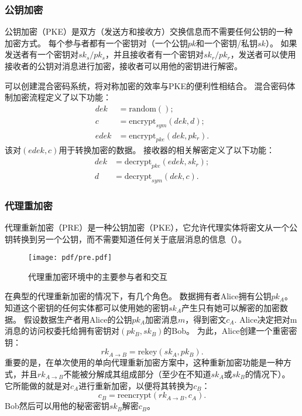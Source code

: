 \documentclass[longbibliography,nofootinbib]{revtex4-1}
\begin{document}
\begin{CJK*}{UTF8}{gbsn}
\subsubsection{公钥加密}

公钥加密（PKE）是双方（发送方和接收方）交换信息而不需要任何公钥的一种加密方式。
每个参与者都有一个密钥对（一个公钥$pk$和一个密钥/私钥$sk$）。
如果发送者有一个密钥对$sk_s/pk_s$，并且接收者有一个密钥对$sk_r/pk_r$，发送者可以使用接收者的公钥对消息进行加密，接收者可以用他的密钥进行解密。

可以创建混合密码系统，将对称加密的效率与PKE的便利性相结合。
混合密码体制加密流程定义了以下功能：
\begin{align}
    dek &= \text{random}();\\
    c &= \text{encrypt}_{sym}(dek, d);\\
    edek &= \text{encrypt}_{pke}(dek, pk_r).
\end{align}
该对$(edek,c)$用于转换加密的数据。
接收器的相关解密定义了以下功能：
\begin{align}
    dek &= \text{decrypt}_{pke}(edek, sk_r);\\
    d &= \text{decrypt}_{sym}(dek, c).
\end{align}

\subsubsection{代理重加密}
代理重新加密（PRE）\cite{wiki:pre,nunez2017proxy}是一种公钥加密（PKE），它允许代理实体将密文从一个公钥转换到另一个公钥，而不需要知道任何关于底层消息的信息（）。

\begin{figure}
\centering
    \texttt{[image: pdf/pre.pdf]}
    \caption{代理重加密环境中的主要参与者和交互}
    \label{fig:pre}
\end{figure}

在典型的代理重新加密的情况下，有几个角色。
数据拥有者Alice拥有公钥$pk_A$。
知道这个密钥的任何实体都可以使用她的密钥$sk_A$产生只有她可以解密的加密数据。
假设数据生产者用Alice的公钥$pk_A$加密消息$m$，得到密文$c_A$.
Alice决定把对m消息的访问权委托给拥有密钥对$(pk_B, sk_B)$的Bob。
为此，Alice创建一个重密密钥：
\begin{equation}
    rk_{A\rightarrow B} = \text{rekey}(sk_A, pk_B).
\end{equation}
重要的是，在单次使用的单向代理重新加密方案中，这种重新加密功能是一种方式，并且$rk_{A\rightarrow B}$不能被分解成其组成部分（至少在不知道$sk_A$或$sk_B$的情况下）。
它所能做的就是对$c_A$进行重新加密，以便将其转换为$c_B$：
\begin{equation}
    c_B = \text{reencrypt}(rk_{A\rightarrow B}, c_{A}).
\end{equation}
Bob然后可以用他的秘密密钥$sk_B$解密$c_B$。


\end{CJK*}
\end{document}
